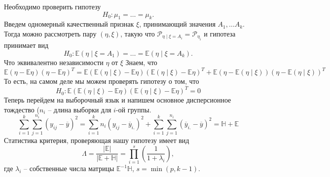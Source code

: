 Необходимо проверить гипотезу 
\begin{equation*}
H_0: \mu_1 = \ldots = \mu_k.
\end{equation*}
Введем одномерный качественный признак $\xi$, принимающий значения $A_1, \ldots A_k$. Тогда можно рассмотреть пару $(\eta, \xi)$, такую что $\mathcal{P}_{\eta \mid \xi = A_i} = \mathcal{P}_{\eta_i}$ и гипотеза принимает вид 
\begin{equation*}
H_0: \mathbb{E}(\eta \mid \xi = A_1) = \ldots = \mathbb{E}(\eta \mid \xi = A_k).
\end{equation*}
Что эквивалентно независимости $\eta$ от $\xi$
Знаем, что 
\begin{equation*}
\mathbb{E}(\eta - \mathbb{E}\eta)(\eta - \mathbb{E}\eta)^T = \mathbb{E}(\mathbb{E}(\eta \mid \xi) - \mathbb{E}\eta)(\mathbb{E}(\eta \mid \xi) - \mathbb{E}\eta)^T + \mathbb{E}(\eta - \mathbb{E}(\eta \mid \xi))(\eta - \mathbb{E}(\eta \mid \xi))^T
\end{equation*} 
То есть, на самом деле мы можем проверять гипотезу о том, что 
\begin{equation*}
H_0: \mathbb{E}(\mathbb{E}(\eta \mid \xi) - \mathbb{E}\eta)(\mathbb{E}(\eta \mid \xi) - \mathbb{E}\eta)^T = 0
\end{equation*}
Теперь перейдем на выборочный язык и напишем основное дисперсионное тождество ($n_i$ -- длина выборки для $i$-ой группы.
\begin{equation*}
\sum\limits_{i = 1}^{k}\sum\limits_{j = 1}^{n_i}(y_{ij} - \overline{y})^2 = \sum\limits_{i = 1}^{k}n_i(y_{ij} - \overline{y}_{i.})^2  + \sum\limits_{i = 1}^{k}\sum\limits_{j = 1}^{n_i}(\overline{y}_{i.} - \overline{y})^2 = \mathbb{H} + \mathbb{E}
\end{equation*}
Статистика критерия, проверяющая нашу гипотезу имеет вид
\begin{equation}
\Lambda = \frac{|\mathbb{E}|}{|\mathbb{E} + \mathbb{H}|} = \prod\limits_{i = 1}^s (\frac{1}{1 + \lambda_i}),
\label{maov}
\end{equation}
где $\lambda_i$ -- собственные числа матрицы $\mathbb{E}^{-1} \mathbb{H}$, $s = \min(p, k-1).$

